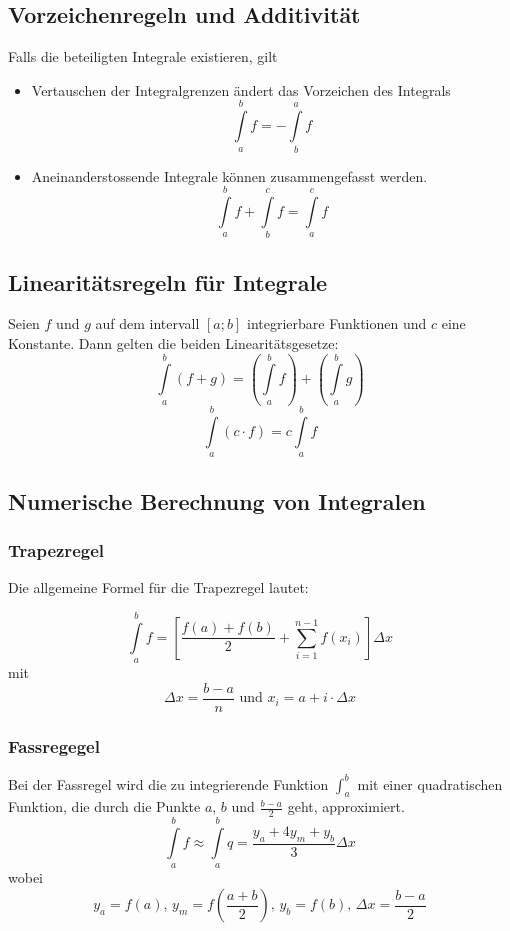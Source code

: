 \documentclass[10pt,a4paper]{scrartcl}
\begin{document}
\subsection{Vorzeichenregeln und Additivität}

Falls die beteiligten Integrale existieren, gilt
\begin{itemize}
\item Vertauschen der Integralgrenzen ändert das Vorzeichen des Integrals
$$\int\limits_a^b f = - \int\limits_b^a f$$
\item Aneinanderstossende Integrale können zusammengefasst werden.
$$\int\limits_a^b f + \int\limits_b^c f = \int\limits_a^c f$$
\end{itemize}


\subsection{Linearitätsregeln für Integrale}

Seien $f$ und $g$ auf dem intervall $[a;b]$ integrierbare Funktionen und $c$ eine
Konstante. Dann gelten die beiden Linearitätsgesetze:
$$\int\limits_a^b (f + g) = \left(\int\limits_a^b f\right) + 
    \left(\int\limits_a^b g\right)$$
$$\int\limits_a^b (c \cdot f) = c \int\limits_a^b f$$


\subsection{Numerische Berechnung von Integralen}

\subsubsection{Trapezregel}

Die allgemeine Formel für die Trapezregel lautet:

$$\int\limits_a^b f = \left[\frac{f(a) + f(b)}{2} + \sum_{i=1}^{n-1} f(x_i)\right] \Delta x$$
mit
$$\Delta x = \frac{b-a}{n} \textrm{ und } x_i = a + i \cdot \Delta x$$

\subsubsection{Fassregegel}

Bei der Fassregel wird die zu integrierende Funktion $\int_a^b$ mit einer quadratischen
Funktion, die durch die Punkte $a$, $b$ und $\frac{b-a}{2}$ geht, approximiert.
$$\int\limits_a^b f \approx \int\limits_a^b q = \frac{y_a + 4y_m + y_b}{3} \Delta x$$
wobei
$$y_a = f(a) \textrm{, } y_m = f\left(\frac{a+b}{2}\right) \textrm{, } y_b = f(b) \textrm{, } \Delta x = \frac{b-a}{2}$$
\end{document}

